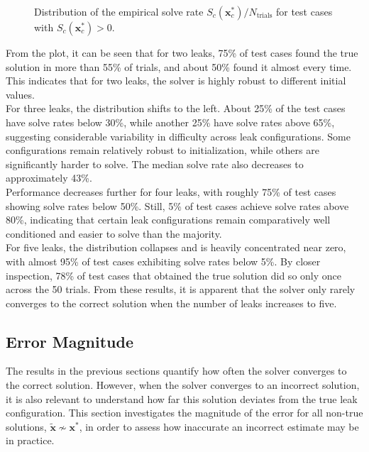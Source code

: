 \begin{figure}[ht]
    \centering
    
    \caption[Distribution of the empirical solve rate]{Distribution of the empirical solve rate $S_c(\mathbf{x}_c^*)/N_{\text{trials}}$ for test cases with $S_c(\mathbf{x}_c^*) > 0$.}    
    \label{fig:sol_rate_across_trials}
\end{figure}

From the plot, it can be seen that for two leaks, 75\% of test cases found the true solution in more than 55\% of trials, and about 50\% found it almost every time. This indicates that for two leaks, the solver is highly robust to different initial values. \\

For three leaks, the distribution shifts to the left. About 25\% of the test cases have solve rates below 30\%, while another 25\% have solve rates above 65\%, suggesting considerable variability in difficulty across leak configurations. Some configurations remain relatively robust to initialization, while others are significantly harder to solve. The median solve rate also decreases to approximately 43\%.\\

Performance decreases further for four leaks, with roughly 75\% of test cases showing solve rates below 50\%. Still, 5\% of test cases achieve solve rates above 80\%, indicating that certain leak configurations remain comparatively well conditioned and easier to solve than the majority.\\

For five leaks, the distribution collapses and is heavily concentrated near zero, with almost 95\% of test cases exhibiting solve rates below 5\%. By closer inspection, 78\% of test cases that obtained the true solution did so only once across the 50 trials. From these results, it is apparent that the solver only rarely converges to the correct solution when the number of leaks increases to five.\\

\subsection{Error Magnitude}
\label{sec:err_mag}

The results in the previous sections quantify how often the solver converges to the correct solution. However, when the solver converges to an incorrect solution, it is also relevant to understand how far this solution deviates from the true leak configuration. This section investigates the magnitude of the error for all non-true solutions, $\tilde{\mathbf{x}} \nsim \mathbf{x}^*$, in order to assess how inaccurate an incorrect estimate may be in practice.\\

